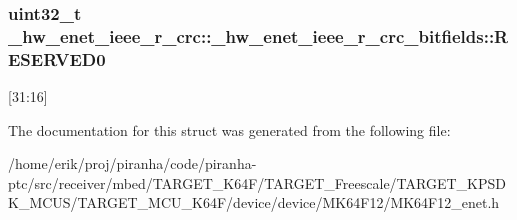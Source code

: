 \subsubsection[{\texorpdfstring{R\+E\+S\+E\+R\+V\+E\+D0}{RESERVED0}}]{\setlength{\rightskip}{0pt plus 5cm}uint32\+\_\+t \+\_\+hw\+\_\+enet\+\_\+ieee\+\_\+r\+\_\+crc\+::\+\_\+hw\+\_\+enet\+\_\+ieee\+\_\+r\+\_\+crc\+\_\+bitfields\+::\+R\+E\+S\+E\+R\+V\+E\+D0}\hypertarget{struct__hw__enet__ieee__r__crc_1_1__hw__enet__ieee__r__crc__bitfields_a26210784b44632bb49da8ea3319ae942}{}\label{struct__hw__enet__ieee__r__crc_1_1__hw__enet__ieee__r__crc__bitfields_a26210784b44632bb49da8ea3319ae942}
\mbox{[}31\+:16\mbox{]} 

The documentation for this struct was generated from the following file\+:\begin{DoxyCompactItemize}
\item 
/home/erik/proj/piranha/code/piranha-\/ptc/src/receiver/mbed/\+T\+A\+R\+G\+E\+T\+\_\+\+K64\+F/\+T\+A\+R\+G\+E\+T\+\_\+\+Freescale/\+T\+A\+R\+G\+E\+T\+\_\+\+K\+P\+S\+D\+K\+\_\+\+M\+C\+U\+S/\+T\+A\+R\+G\+E\+T\+\_\+\+M\+C\+U\+\_\+\+K64\+F/device/device/\+M\+K64\+F12/M\+K64\+F12\+\_\+enet.\+h\end{DoxyCompactItemize}
